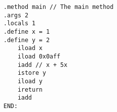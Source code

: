 \documentclass{article}
\begin{document}
  \begin{verbatim}
.method main // The main method
.args 2
.locals 1
.define x = 1
.define y = 2
    iload x
    iload 0x0aff
    iadd // x + 5x
    istore y
    iload y
    ireturn
    iadd
END:
  \end{verbatim}
\end{document}
